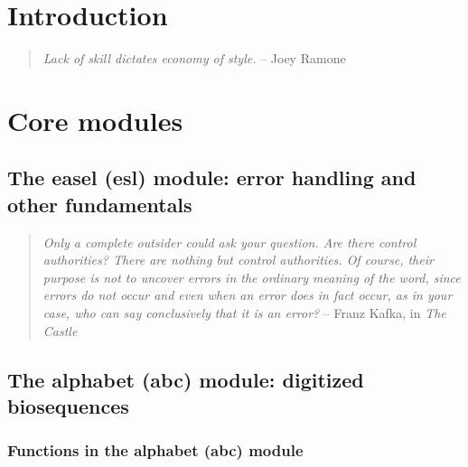 \documentclass[11pt]{book}
\begin{document}


\newpage
\tableofcontents

\newpage
\chapter{Introduction}

\vspace*{\fill}
\begin{quote}
\emph{Lack of skill dictates economy of style.} \hspace{3em} -- Joey Ramone
\end{quote}     

\newpage
\chapter{Core modules}

\section{The easel (esl) module: error handling and other fundamentals}

\vspace*{\fill}
\begin{quote}
\emph{Only a complete outsider could ask your question. Are there
control authorities? There are nothing but control authorities. Of
course, their purpose is not to uncover errors in the ordinary meaning
of the word, since errors do not occur and even when an error does in
fact occur, as in your case, who can say conclusively that it is an
error?} \hspace{3em} -- Franz Kafka, in \emph{The Castle}
\end{quote}     

\newpage
\section{The alphabet (abc) module: digitized biosequences}

\subsection{Functions in the alphabet (abc) module}


%
\end{document}
